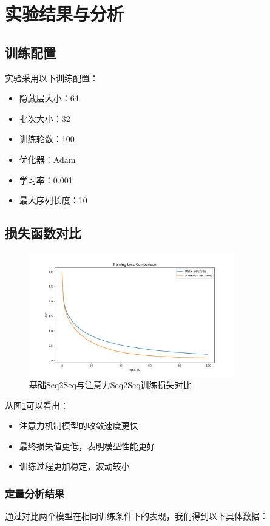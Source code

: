 \documentclass[a4paper]{article}
\begin{document}
\section{实验结果与分析}
\subsection{训练配置}
实验采用以下训练配置：
\begin{itemize}
    \item 隐藏层大小：64
    \item 批次大小：32
    \item 训练轮数：100
    \item 优化器：Adam
    \item 学习率：0.001
    \item 最大序列长度：10
\end{itemize}

\subsection{损失函数对比}
\begin{figure}[H]
    \centering
    \includegraphics[width=0.8\textwidth]{results/loss_comparison.png}
    \caption{基础Seq2Seq与注意力Seq2Seq训练损失对比}
    \label{fig:loss_comparison}
\end{figure}

从图\ref{fig:loss_comparison}可以看出：
\begin{itemize}
    \item 注意力机制模型的收敛速度更快
    \item 最终损失值更低，表明模型性能更好
    \item 训练过程更加稳定，波动较小
\end{itemize}

\subsubsection{定量分析结果}
通过对比两个模型在相同训练条件下的表现，我们得到以下具体数据：
\end{document}
